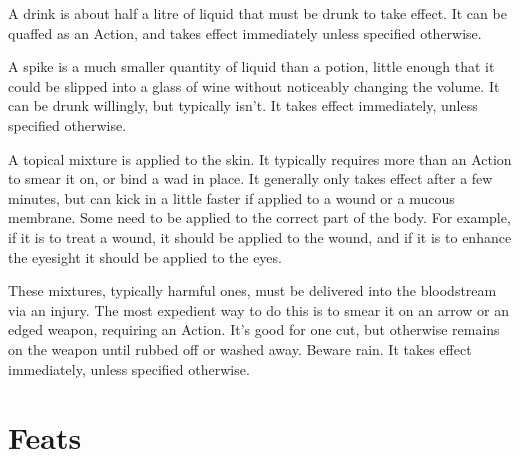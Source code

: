 A drink is about half a litre of liquid that must be drunk to take effect.
It can be quaffed as an Action, and takes effect immediately unless specified otherwise.

A spike is a much smaller quantity of liquid than a potion, little enough that it could be slipped into a glass of wine without noticeably changing the volume.
It can be drunk willingly, but typically isn't.
It takes effect immediately, unless specified otherwise.

A topical mixture is applied to the skin.
It typically requires more than an Action to smear it on, or bind a wad in place.
It generally only takes effect after a few minutes, but can kick in a little faster if applied to a wound or a mucous membrane.
Some need to be applied to the correct part of the body.
For example, if it is to treat a wound, it should be applied to the wound, and if it is to enhance the eyesight it should be applied to the eyes.

These mixtures, typically harmful ones, must be delivered into the bloodstream via an injury.
The most expedient way to do this is to smear it on an arrow or an edged weapon, requiring an Action.
It's good for one cut, but otherwise remains on the weapon until rubbed off or washed away.
Beware rain.
It takes effect immediately, unless specified otherwise.


\section{Feats}




